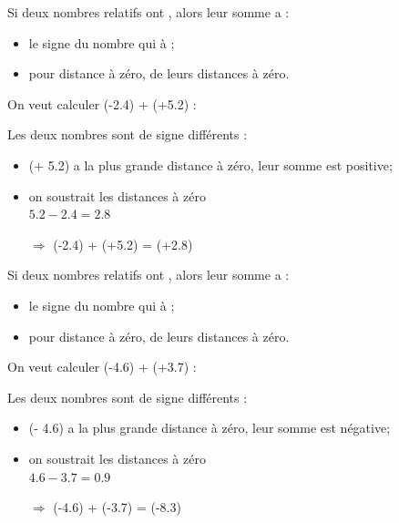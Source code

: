 \documentclass[xcolor={dvipsnames}]{beamer}
\begin{document}
\begin{frame}
	\begin{myprop}
		Si deux nombres relatifs ont , alors leur somme a :\pause
		\begin{itemize}
			\item le signe du nombre qui à ; \pause
			\item pour distance à zéro,  de leurs distances à zéro. \pause
		\end{itemize}
	\end{myprop}


	\begin{myex}
		On veut calculer (-\num{2.4}) + (+\num{5.2}) : \pause
		
		Les deux nombres sont de signe différents : \pause
		\begin{itemize}
			\item (+ \num{5.2}) a la plus grande distance à zéro, \pause leur somme est positive; \pause
			\item on soustrait les distances à zéro  \pause \\ $\num{5.2} - \num{2.4} = \num{2.8}$ \pause
			\item[$\Rightarrow$] (-\num{2.4}) + (+\num{5.2}) = \pause (+\num{2.8})
		\end{itemize}
	\end{myex}
\end{frame}


\begin{frame}
	\begin{myprop}
		Si deux nombres relatifs ont , alors leur somme a :\pause
		\begin{itemize}
			\item le signe du nombre qui à ; \pause
			\item pour distance à zéro,  de leurs distances à zéro. \pause
		\end{itemize}
	\end{myprop}
	
	
	\begin{myex}
		On veut calculer (-\num{4.6}) + (+\num{3.7}) : \pause
		
		Les deux nombres sont de signe différents : \pause
		\begin{itemize}
			\item (- \num{4.6}) a la plus grande distance à zéro, leur somme est négative; \pause
			\item on soustrait les distances à zéro \pause \\ $\num{4.6} - \num{3.7} = \num{0.9}$ \pause
			\item[$\Rightarrow$] (-\num{4.6}) + (-\num{3.7}) = \pause (-\num{8.3})
		\end{itemize}
	\end{myex}
\end{frame}
\end{document}
